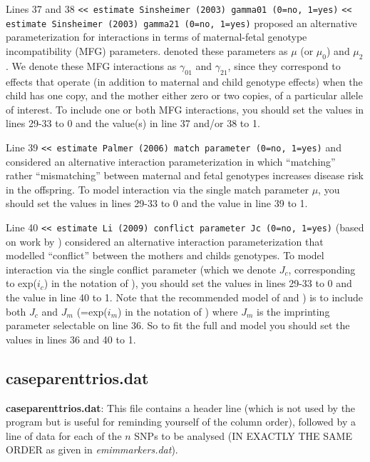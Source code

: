 \documentclass[a4paper,12pt]{article}
\newcommand{\code}[1]{{\footnotesize{{\tt #1}}}}
\begin{document}
Lines 37 and 38 \code{<< estimate Sinsheimer (2003) gamma01 (0=no, 1=yes)} \code{<< estimate Sinsheimer (2003) gamma21 (0=no, 1=yes)} \citet{sinsheimer:etal:03} proposed an alternative parameterization for interactions in terms of maternal-fetal genotype incompatibility (MFG) parameters. \citet{sinsheimer:etal:03} denoted these parameters as $\mu$ (or $\mu_0$) and $\mu_2$. We denote these MFG interactions as $\gamma_{01}$ and $\gamma_{21}$, since they correspond to effects that operate (in addition to maternal and child genotype effects) when the child has one copy, and the mother either zero or two copies, of a particular allele of interest. To include one or both MFG interactions, you should set the values in lines 29-33 to 0 and the value(s) in line 37 and/or 38 to 1. 

Line 39 \code{<< estimate Palmer (2006) match parameter (0=no, 1=yes)} \citet{sinsheimer:etal:03} and \citet{palmer:etal:06} considered an alternative interaction parameterization in which ``matching'' rather ``mismatching'' between maternal and fetal genotypes increases disease risk in the offspring. To model interaction via the single \citet{palmer:etal:06} match parameter $\mu$, you should set the values in lines 29-33 to 0 and the value in line 39 to 1. 

Line 40 \code{<< estimate Li (2009) conflict parameter Jc (0=no, 1=yes)} \citet{li:etal:09} (based on work by \citet{parimi:etal:08}) considered an alternative interaction parameterization that modelled ``conflict'' between the mothers and childs genotypes. To model interaction via the single \citet{li:etal:09} conflict parameter (which we denote $J_c$, corresponding to exp($i_c$) in the notation of \citet{li:etal:09}), you should set the values in lines 29-33 to 0 and the value in line 40 to 1. Note that the recommended model of \citet{li:etal:09} and \citet{parimi:etal:08}) is to include both $J_c$ and $J_m$ (=exp($i_m$) in the notation of \citet{li:etal:09}) where $J_m$ is the imprinting parameter selectable on line 36. So to fit the full \citet{li:etal:09} and \citet{parimi:etal:08} model you should set the values in lines 36 and 40 to 1. 


\subsection{caseparenttrios.dat}
\label{caseparenttrios}

{\bf caseparenttrios.dat}: This file contains a header line (which is not used by the program but is useful for reminding yourself of the column order), followed by a line of data for each of the $n$ SNPs to be analysed (IN EXACTLY THE SAME ORDER as given in {\it emimmarkers.dat}). 
\end{document}
